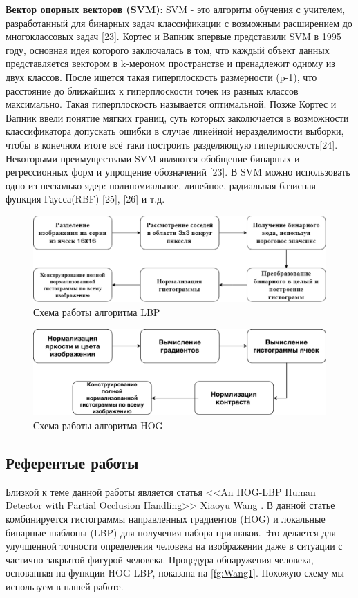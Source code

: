 \documentclass[12pt,twoside]{article}
\begin{document}
\textbf{Вектор опорных векторов (SVM)}: SVM - это алгоритм обучения с учителем, разработанный для бинарных задач классификации с возможным расширением до многоклассовых задач [23]. Кортес и Вапник впервые представили SVM в 1995 году, основная идея которого заключалась в том, что каждый объект данных представляется вектором в k-мероном пространстве и пренадлежит одному из двух классов. После ищется такая гиперплоскость размерности (p-1), что расстояние до ближайших к гиперплоскости точек из разных классов максимально. Такая гиперплоскость называется оптимальной. Позже Кортес и Вапник ввели понятие мягких границ, суть которых заколючается в возможности классификатора допускать ошибки в случае линейной неразделимости выборки, чтобы в конечном итоге всё таки построить разделяющую гиперплоскость[24]. Некоторыми преимуществами SVM являются обобщение бинарных и регрессионных форм и упрощение обозначений [23]. В SVM можно использовать одно из несколько ядер: полиномиальное, линейное, радиальная базисная функция Гаусса(RBF) [25], [26] и т.д.
\begin{figure}[H]
	\includegraphics[width=1\textwidth]{LBP}
	\caption{Схема работы алгоритма LBP\cite{Comparing}}
	\label{fg:LBP}
\end{figure}

\begin{figure}[H]
	\includegraphics[width=1\textwidth]{HOG}
	\caption{Схема работы алгоритма HOG }
	\label{fg:HOG}
\end{figure}

\subsection{Референтые работы}
Близкой к теме данной работы является статья <<An HOG-LBP Human Detector with Partial Occlusion Handling>> Xiaoyu Wang \cite{Wang09}. В данной статье комбинируется гистограммы направленных градиентов (HOG) и локальные бинарные шаблоны (LBP) для получения набора признаков. Это делается для улучшенной точности определения человека на изображении даже в ситуации с частично закрытой фигурой человека. Процедура обнаружения человека, основанная на функции HOG-LBP, показана на \ref{fg:Wang1}. Похожую схему мы используем в нашей работе. 
\end{document}

